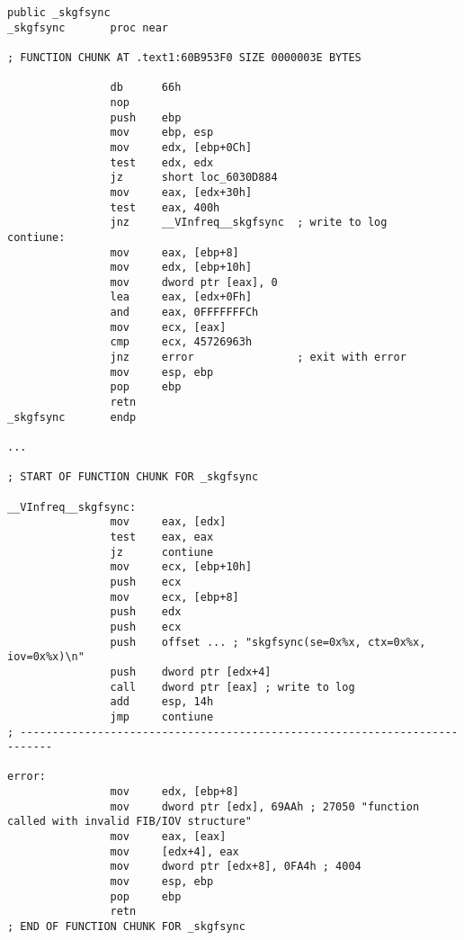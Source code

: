 \begin{lstlisting}[caption=orageneric11.dll (win32)]
                public _skgfsync
_skgfsync       proc near

; FUNCTION CHUNK AT .text1:60B953F0 SIZE 0000003E BYTES

                db      66h
                nop
                push    ebp
                mov     ebp, esp
                mov     edx, [ebp+0Ch]
                test    edx, edx
                jz      short loc_6030D884
                mov     eax, [edx+30h]
                test    eax, 400h
                jnz     __VInfreq__skgfsync  ; write to log
contiune:
                mov     eax, [ebp+8]
                mov     edx, [ebp+10h]
                mov     dword ptr [eax], 0
                lea     eax, [edx+0Fh]
                and     eax, 0FFFFFFFCh
                mov     ecx, [eax]
                cmp     ecx, 45726963h
                jnz     error                ; exit with error
                mov     esp, ebp
                pop     ebp
                retn
_skgfsync       endp

...

; START OF FUNCTION CHUNK FOR _skgfsync

__VInfreq__skgfsync:
                mov     eax, [edx]
                test    eax, eax
                jz      contiune
                mov     ecx, [ebp+10h]
                push    ecx
                mov     ecx, [ebp+8]
                push    edx
                push    ecx
                push    offset ... ; "skgfsync(se=0x%x, ctx=0x%x, iov=0x%x)\n"
                push    dword ptr [edx+4]
                call    dword ptr [eax] ; write to log
                add     esp, 14h
                jmp     contiune
; ---------------------------------------------------------------------------

error:
                mov     edx, [ebp+8]
                mov     dword ptr [edx], 69AAh ; 27050 "function called with invalid FIB/IOV structure"
                mov     eax, [eax]
                mov     [edx+4], eax
                mov     dword ptr [edx+8], 0FA4h ; 4004
                mov     esp, ebp
                pop     ebp
                retn
; END OF FUNCTION CHUNK FOR _skgfsync
\end{lstlisting}

